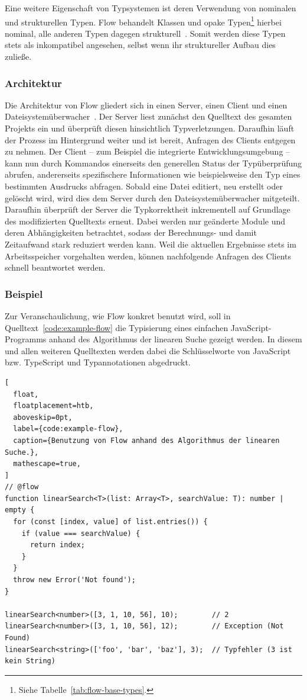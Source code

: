 Eine weitere Eigenschaft von Typsystemen ist deren Verwendung von nominalen und strukturellen Typen. Flow behandelt Klassen und opake Typen\footnote{Siehe Tabelle~\ref{tab:flow-base-types}.} hierbei nominal, alle anderen Typen dagegen strukturell~\autocite{FLOW:NOMINAL_TYPES}. Somit werden diese Typen stets als inkompatibel angesehen, selbst wenn ihr struktureller Aufbau dies zuließe.

\subsubsection{Architektur}

Die Architektur von Flow gliedert sich in einen Server, einen Client und einen Dateisystemüberwacher~\autocite[22]{FLOW:PAPER}. Der Server liest zunächst den Quelltext des gesamten Projekts ein und überprüft diesen hinsichtlich Typverletzungen. Daraufhin läuft der Prozess im Hintergrund weiter und ist bereit, Anfragen des Clients entgegen zu nehmen. Der Client -- zum Beispiel die integrierte Entwicklungsumgebung -- kann nun durch Kommandos einerseits den generellen Status der Typüberprüfung abrufen, andererseits spezifischere Informationen wie beispielsweise den Typ eines bestimmten Ausdrucks abfragen. Sobald eine Datei editiert, neu erstellt oder gelöscht wird, wird dies dem Server durch den Dateisystemüberwacher mitgeteilt. Daraufhin überprüft der Server die Typkorrektheit inkrementell auf Grundlage des modifizierten Quelltexts erneut. Dabei werden nur geänderte Module und deren Abhängigkeiten betrachtet, sodass der Berechnungs- und damit Zeitaufwand stark reduziert werden kann. Weil die aktuellen Ergebnisse stets im Arbeitsspeicher vorgehalten werden, können nachfolgende Anfragen des Clients schnell beantwortet werden.

\subsubsection{Beispiel}

Zur Veranschaulichung, wie Flow konkret benutzt wird, soll in Quelltext~\ref{code:example-flow} die Typisierung eines einfachen JavaScript-Programms anhand des Algorithmus der linearen Suche gezeigt werden. In diesem und allen weiteren Quelltexten werden dabei die Schlüsselworte von JavaScript bzw. TypeScript  und Typannotationen  abgedruckt.

\begin{lstlisting}[
  float,
  floatplacement=htb,
  aboveskip=0pt,
  label={code:example-flow},
  caption={Benutzung von Flow anhand des Algorithmus der linearen Suche.},
  mathescape=true,
]
// @flow
function linearSearch<T>(list: Array<T>, searchValue: T): number | empty {
  for (const [index, value] of list.entries()) {
    if (value === searchValue) {
      return index;
    }
  }
  throw new Error('Not found');
}

linearSearch<number>([3, 1, 10, 56], 10);        // 2
linearSearch<number>([3, 1, 10, 56], 12);        // Exception (Not Found)
linearSearch<string>(['foo', 'bar', 'baz'], 3);  // Typfehler (3 ist kein String)
\end{lstlisting}

